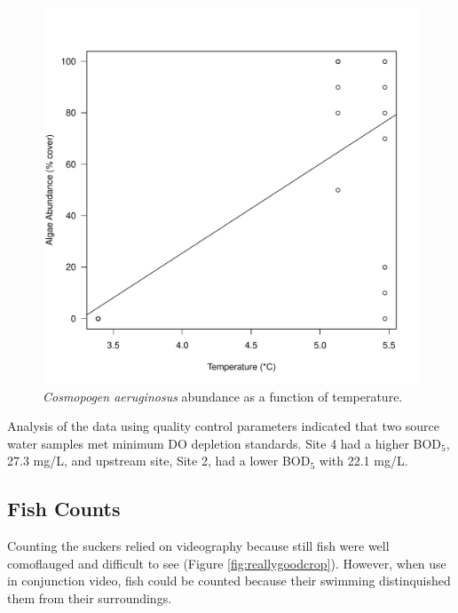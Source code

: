 \documentclass{article}\usepackage[]{graphicx}\usepackage[]{color}
\makeatletter
\def\maxwidth{ %
  \ifdim\Gin@nat@width>\linewidth
    \linewidth
  \else
    \Gin@nat@width
  \fi
}
\newenvironment{knitrout}{}{} %
\makeatother
\begin{document}
\begin{figure}[!ht]
\begin{knitrout}
\color{fgcolor}
\includegraphics[width=\maxwidth]{figure/unnamed-chunk-5-1} 

\end{knitrout}
\caption{\emph{Cosmopogen aeruginosus} abundance as a function of temperature.}
\label{fig:tempalgae}
\end{figure}

Analysis of the data using quality control parameters indicated that two source water samples met minimum DO depletion standards. Site 4 had a higher BOD$_5$, 27.3 mg/L, and upstream site, Site 2, had a lower BOD$_5$ with 22.1 mg/L. 

\subsection{Fish Counts}

Counting the suckers relied on videography because still fish were well comoflauged and difficult to see (Figure \ref{fig:reallygoodcrop}). However, when use in conjunction video, fish could be counted because their swimming distinquished them from their surroundings.
\end{document}
